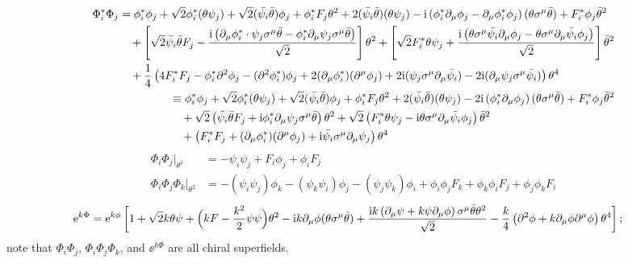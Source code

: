 \documentclass[CheatSheet]{subfiles}
\begin{document}
\begin{align}
\begin{split}
 \Phi_i^* \Phi_j
 &=
 \phi_i^*\phi_j + \sqrt{2} \phi_i^*(\theta \psi_j)+\sqrt{2} (\bar{\psi_i}\bar\theta)\phi_j
 + \phi_i^* F_j \theta^2+2 (\bar{\psi_i}\bar\theta)(\theta \psi_j)
 -\mathrm{i} \left(\phi_i^*\partial_{\mu}\phi_j-\partial_{\mu}\phi_i^*\phi_j\right) (\theta \sigma^{\mu}\bar\theta)
 +F_i^*\phi_j \bar\theta^2
 \\&\quad
+\left[
\sqrt{2} \bar{\psi_i}\bar\theta F_j-\frac{\mathrm{i}\left( \partial_{\mu}\phi_i^*\cdot\psi_j\sigma^{\mu}\bar\theta-\phi_i^*\partial_{\mu}\psi_j\sigma^{\mu}\bar\theta\right)}{\sqrt2}\right]\theta^2
+\left[\sqrt2 F_i^*\theta \psi_j+\frac{\mathrm{i}\left(\theta \sigma^{\mu}\bar{\psi_i}\partial_{\mu}\phi_j-\theta \sigma^{\mu}\partial_{\mu}\bar{\psi_i}\phi_j\right)}{\sqrt2}\right] \bar\theta^2
\\&\quad
+\frac{1}{4} \left(4 F_i^*F_j-\phi_i^*\partial^2\phi_j-(\partial^2\phi_i^*)\phi_j+2 (\partial_{\mu}\phi_i^*)(\partial^{\mu}\phi_j)+2 \mathrm{i} (\psi_j\sigma^{\mu}\partial_{\mu}\bar{\psi_i})-2 \mathrm{i} (\partial_{\mu}\psi_j\sigma^{\mu}\bar{\psi_i})\right) \theta^4
\end{split}
\\
\begin{split}
 &\equiv
 \phi_i^*\phi_j + \sqrt{2} \phi_i^*(\theta \psi_j)+\sqrt{2} (\bar{\psi_i}\bar\theta)\phi_j
 + \phi_i^* F_j \theta^2+2 (\bar{\psi_i}\bar\theta)(\theta \psi_j)
 -2\mathrm{i} \left(\phi_i^*\partial_{\mu}\phi_j\right) (\theta \sigma^{\mu}\bar\theta)
 +F_i^*\phi_j \bar\theta^2
 \\&\quad
+\sqrt2\left(
\bar{\psi_i}\bar\theta F_j+\mathrm{i}\phi_i^*\partial_{\mu}\psi_j\sigma^{\mu}\bar\theta\right)\theta^2
+\sqrt2\left(F_i^*\theta \psi_j-\mathrm{i}\theta \sigma^{\mu}\partial_{\mu}\bar{\psi_i}\phi_j\right) \bar\theta^2
\\&\quad
+\left(F_i^*F_j+(\partial_{\mu}\phi_i^*)(\partial^{\mu}\phi_j)+\mathrm{i}\bar{\psi_i}\sigma^\mu\partial_{\mu}\psi_j\right) \theta^4
\end{split}
\end{align}
\begin{align}
 \Phi_i\Phi_j\Big|_{\theta^2}&=-\psi_i\psi_j+F_i\phi_j+\phi_iF_j
\\
\Phi_i\Phi_j\Phi_k\Big|_{\theta^2}&=
-(\psi_i\psi_j)\phi_k-(\psi_k\psi_i)\phi_j-(\psi_j\psi_k)\phi_i+\phi_i\phi_jF_k+\phi_k\phi_iF_j+\phi_j\phi_kF_i
\end{align}
\begin{equation}
 \begin{split}
\mathop{}\!\mathrm{e}^{k\Phi} &=
\mathop{}\!\mathrm{e}^{k\phi}\left[1+\sqrt{2} k \theta \psi+\Bigl(kF-\frac{k^2}{2}\psi\psi\Bigr) \theta^2-\mathrm{i} k \partial_{\mu}\phi (\theta \sigma^{\mu}\bar\theta)
+\frac{\mathrm{i} k \left(\partial_{\mu}\psi+k\psi\partial_{\mu}\phi\right)\sigma^{\mu}\bar\theta \theta^2}{\sqrt{2}}-\frac{k}{4} \left(\partial^2\phi+k \partial_{\mu}\phi\partial^{\mu}\phi\right) \theta^4\right];
\end{split}
\end{equation}
note that $\Phi_i\Phi_j$, $\Phi_i\Phi_j\Phi_k$, and $\ee^{k\Phi}$ are all chiral superfields.
\end{document}
